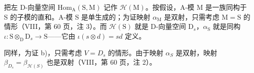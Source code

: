 把左 D-向量空间 \(\mathrm{Hom}_{\mathrm{A}}(\mathrm{S},\mathrm{M})\) 记作 \(\mathcal{H}(\mathrm{M})\)。按假设，A-模 M 是一族同构于 S 的子模的直和。A-模 S 是单生成的；为证映射 \(\alpha_{\mathrm{M}}\) 是双射，只需考虑 \(\mathrm{M} = \mathrm{S}\) 的情形（VIII，第 60 页，注 3）。而 \(\mathcal{H}(\mathrm{S})\) 就是 D-向量空间 \(\mathrm{D}_s\)，\(\alpha_{\mathrm{S}}\) 就是同构 \(\iota : \mathrm{S} \otimes_{\mathrm{D}} \mathrm{D}_s \to \mathrm{S}\)——它由 \(\iota(s \otimes d) = sd\) 定义。

同样，为证 b)，只需考虑 \(V = D_{s}\) 的情形。由于映射 \(\alpha_{S}\) 是双射，映射 \(\beta_{D_{s}} = \beta_{\mathcal{H}(S)}\) 也是双射（VIII，第 60 页，注 2）。

